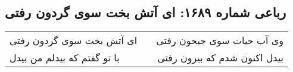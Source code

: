 \begin{center}
\section*{رباعی شماره ۱۶۸۹: ای آتش بخت سوی گردون رفتی}
\label{sec:1689}
\begin{longtable}{l p{0.5cm} r}
ای آتش بخت سوی گردون رفتی
&&
وی آب حیات سوی جیحون رفتی
\\
با تو گفتم که بیدلم من بیدل
&&
بیدل اکنون شدم که بیرون رفتی
\\
\end{longtable}
\end{center}
